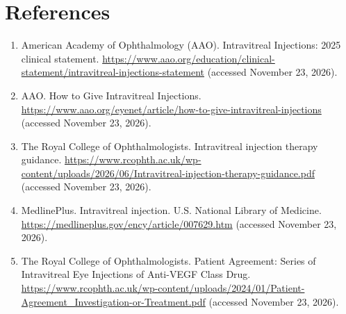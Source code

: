 \section*{References}
\begin{enumerate}
  \item American Academy of Ophthalmology (AAO). Intravitreal Injections: 2025 clinical statement. \url{https://www.aao.org/education/clinical-statement/intravitreal-injections-statement} (accessed November 23, 2026).
  \item AAO. How to Give Intravitreal Injections. \url{https://www.aao.org/eyenet/article/how-to-give-intravitreal-injections} (accessed November 23, 2026).
  \item The Royal College of Ophthalmologists. Intravitreal injection therapy guidance. \url{https://www.rcophth.ac.uk/wp-content/uploads/2026/06/Intravitreal-injection-therapy-guidance.pdf} (accessed November 23, 2026).
  \item MedlinePlus. Intravitreal injection. U.S. National Library of Medicine. \url{https://medlineplus.gov/ency/article/007629.htm} (accessed November 23, 2026).
  \item The Royal College of Ophthalmologists. Patient Agreement: Series of Intravitreal Eye Injections of Anti-VEGF Class Drug. \url{https://www.rcophth.ac.uk/wp-content/uploads/2024/01/Patient-Agreement_Investigation-or-Treatment.pdf} (accessed November 23, 2026).
\end{enumerate}

\clearpage
